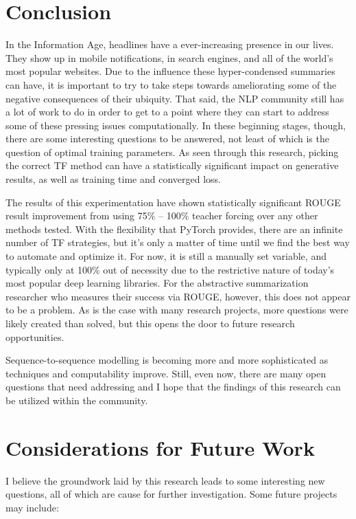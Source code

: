 \section{Conclusion}
In the Information Age, headlines have a ever-increasing presence in our lives. They show up in mobile notifications, in search engines, and all of the world's most popular websites. Due to the influence these hyper-condensed summaries can have, it is important to try to take steps towards ameliorating some of the negative consequences of their ubiquity. That said, the NLP community still has a lot of work to do in order to get to a point where they can start to address some of these pressing issues computationally. In these beginning stages, though, there are some interesting questions to be answered, not least of which is the question of optimal training parameters. As seen through this research, picking the correct TF method can have a statistically significant impact on generative results, as well as training time and converged loss.

The results of this experimentation have shown statistically significant ROUGE result improvement from using 75\% -- 100\% teacher forcing over any other methods tested. With the flexibility that PyTorch provides, there are an infinite number of TF strategies, but it's only a matter of time until we find the best way to automate and optimize it. For now, it is still a manually set variable, and typically only at 100\% out of necessity due to the restrictive nature of today's most popular deep learning libraries. For the abstractive summarization researcher who measures their success via ROUGE, however, this does not appear to be a problem. As is the case with many research projects, more questions were likely created than solved, but this opens the door to future research opportunities.

Sequence-to-sequence modelling is becoming more and more sophisticated as techniques and computability improve. Still, even now, there are many open questions that need addressing and I hope that the findings of this research can be utilized within the community.
\newpage
\section{Considerations for Future Work}
I believe the groundwork laid by this research leads to some interesting new questions, all of which are cause for further investigation. Some future projects may include:

